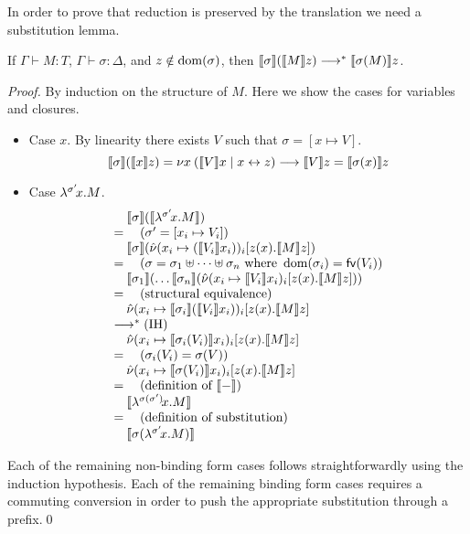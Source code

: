 \documentclass[orivec,envcountsame]{llncs}
\begin{document}
In order to prove that reduction is preserved by the translation we need a substitution lemma.
\begin{lemma}
\label{lem:tocp-subst}
If $\Gamma \vdash M : T$, $\Gamma \vdash \sigma : \Delta$, and $z \notin \operatorname{dom}(\sigma)$, then
$\llbracket \sigma \rrbracket(\llbracket M \rrbracket z) \longrightarrow^* \llbracket \sigma(M) \rrbracket z$.
\end{lemma}
\begin{proof}
By induction on the structure of $M$. Here we show the cases for variables and closures.
\begin{itemize}
\item Case $x$. By linearity there exists $V$ such that $\sigma = [x \mapsto V]$.
\[
\llbracket \sigma \rrbracket(\llbracket x \rrbracket z) =
\nu x \: (\llbracket V \rrbracket x \mid x \leftrightarrow z) \longrightarrow \llbracket V \rrbracket z = \llbracket \sigma(x) \rrbracket z
\]
\item Case $\lambda^{\sigma'}\!x.M$.
\[
\bl
\quad \tocp{\sigma}(\tocp{\clos{\sigma'}{x}{M}}) \\
= \quad (\sigma' = [x_i \mapsto V_i]) \\
\quad \tocp{\sigma}(\hat{\nu} (x_i \mapsto (\tocp{V_i}x_i))_i[z(x).\tocp{M}z]) \\
= \quad (\sigma = \sigma_1 \uplus \dots \uplus \sigma_n \text{ where } \dom(\sigma_i) = \fv(V_i)) \\
\quad \tocp{\sigma_1}(\dots\tocp{\sigma_n} (\hat{\nu} (x_i \mapsto \tocp{V_i}x_i)_i[z(x).\tocp{M}z])) \\
= \quad (\text{structural equivalence}) \\
\quad \hat{\nu} (x_i \mapsto \tocp{\sigma_i}(\tocp{V_i}x_i))_i[z(x).\tocp{M}z] \\
\rto^* (\text{IH}) \\
\quad \hat{\nu} (x_i \mapsto \tocp{\sigma_i(V_i)}x_i)_i[z(x).\tocp{M}z] \\
= \quad (\sigma_i(V_i) = \sigma(V)) \\
\quad \hat{\nu} (x_i \mapsto \tocp{\sigma(V_i)}x_i)_i[z(x).\tocp{M}z] \\
= \quad (\text{definition of }\tocp{-}) \\
\quad \tocp{\clos{\sigma(\sigma')}{x}{M}} \\
= \quad (\text{definition of substitution}) \\
\quad \tocp{\sigma(\clos{\sigma'}{x}{M})} \\
\el
\]
\end{itemize}
Each of the remaining non-binding form cases follows straightforwardly using the induction
hypothesis. Each of the remaining binding form cases requires a commuting conversion in order to
push the appropriate substitution through a prefix.\qed
\end{proof}
\end{document}
